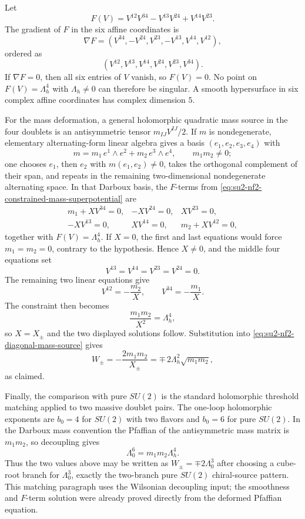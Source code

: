 Let
\[
  F(V)=V^{12}V^{34}-V^{13}V^{24}+V^{14}V^{23}.
\]
The gradient of \(F\) in the six affine coordinates is
\[
  \nabla F
  =
  (V^{34},-V^{24},V^{23},-V^{13},V^{14},V^{12}),
\]
ordered as
\[
  (V^{12},V^{13},V^{14},V^{24},V^{23},V^{34}).
\]
If \(\nabla F=0\), then all six entries of \(V\) vanish, so \(F(V)=0\).
No point on \(F(V)=\Lambda_h^4\) with \(\Lambda_h\neq0\) can therefore be
singular.  A smooth hypersurface in six complex affine coordinates has
complex dimension \(5\).

For the mass deformation, a general holomorphic quadratic mass source in the
four doublets is an antisymmetric tensor \(m_{IJ}V^{IJ}/2\).  If \(m\) is
nondegenerate, elementary alternating-form linear algebra gives a basis
\((e_1,e_2,e_3,e_4)\) with
\[
  m=m_1\,e^1\wedge e^2+m_2\,e^3\wedge e^4,
  \qquad m_1m_2\neq0;
\]
one chooses \(e_1\), then \(e_2\) with \(m(e_1,e_2)\neq0\), takes the
orthogonal complement of their span, and repeats in the remaining
two-dimensional nondegenerate alternating space.  In that Darboux basis, the
\(F\)-terms from
\eqref{eq:su2-nf2-constrained-mass-superpotential} are
\[
\begin{array}{lll}
  m_1+XV^{34}=0, & -XV^{24}=0, & XV^{23}=0,\\
  -XV^{13}=0, & XV^{14}=0, & m_2+XV^{12}=0,
\end{array}
\]
together with \(F(V)=\Lambda_h^4\).  If \(X=0\), the first and last equations
would force \(m_1=m_2=0\), contrary to the hypothesis.  Hence \(X\neq0\),
and the middle four equations set
\[
  V^{13}=V^{14}=V^{23}=V^{24}=0.
\]
The remaining two linear equations give
\[
  V^{12}=-\frac{m_2}{X},\qquad
  V^{34}=-\frac{m_1}{X}.
\]
The constraint then becomes
\[
  \frac{m_1m_2}{X^2}=\Lambda_h^4,
\]
so \(X=X_\pm\) and the two displayed solutions follow.  Substitution into
\eqref{eq:su2-nf2-diagonal-mass-source} gives
\[
  W_\pm
  =
  -\frac{2m_1m_2}{X_\pm}
  =
  \mp\,2\Lambda_h^2\sqrt{m_1m_2},
\]
as claimed.

Finally, the comparison with pure \(SU(2)\) is the standard holomorphic
threshold matching applied to two massive doublet pairs.  The one-loop
holomorphic exponents are \(b_0=4\) for \(SU(2)\) with two flavors and
\(b_0=6\) for pure \(SU(2)\).  In the Darboux mass convention the Pfaffian
of the antisymmetric mass matrix is \(m_1m_2\), so decoupling gives
\[
  \Lambda_0^6=m_1m_2\Lambda_h^4.
\]
Thus the two values above may be written as \(W_\pm=\mp2\Lambda_0^3\) after
choosing a cube-root branch for \(\Lambda_0^3\), exactly the two-branch
pure \(SU(2)\) chiral-source pattern.  This matching paragraph uses the
Wilsonian decoupling input; the smoothness and \(F\)-term solution were
already proved directly from the deformed Pfaffian equation.

